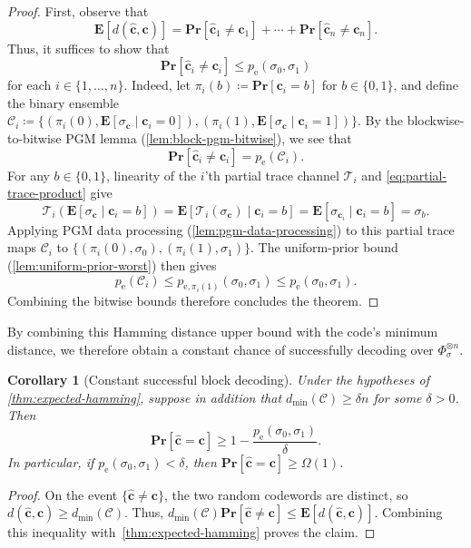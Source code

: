 \documentclass[11pt]{article}
\renewcommand{\leq}{\leqslant}
\renewcommand{\geq}{\geqslant}
\newtheorem{corollary}[corollary]{Corollary}
\theoremstyle{remark}
\newcommand{\cC}{\mathcal{C}}
\newcommand{\T}{\mathcal{T}}
\newcommand{\Eb}{\mathbf{E}}
\newcommand{\Prb}{\mathbf{Pr}}
\newcommand{\bits}{\{0,1\}}
\newcommand{\bchat}{\hat{\mathbf{c}}}
\newcommand{\bc}{\mathbf{c}}
\begin{document}
\begin{proof}
First, observe that
\begin{equation*}
\Eb[d(\bchat,\bc)] = \Prb[\bchat_1 \neq \bc_1] + \cdots + \Prb[\bchat_n \neq \bc_n].
\end{equation*}
Thus, it suffices to show that
\begin{equation*}
\Prb[\bchat_i \neq \bc_i] \leq p_{\mathrm{e}}(\sigma_0,\sigma_1)
\end{equation*}
for each $i \in \{1, \ldots , n\}$. Indeed, let $\pi_i(b) \coloneqq \Prb[\bc_i = b]$ for $b \in \bits$, and define the binary ensemble $\cC_i \coloneqq \{(\pi_i(0), \Eb[\sigma_{\bc} \mid \bc_i = 0]), (\pi_i(1), \Eb[\sigma_{\bc} \mid \bc_i = 1])\}$. By the blockwise-to-bitwise PGM lemma (\cref{lem:block-pgm-bitwise}), we see that
\begin{equation*}
\Prb[\bchat_i \neq \bc_i] = p_{\mathrm{e}}(\cC_i).
\end{equation*}
For any $b \in \bits$, linearity of the $i$'th partial trace channel $\T_i$ and \eqref{eq:partial-trace-product} give
\begin{equation*}
\T_i\left(\Eb[\sigma_\bc \mid \bc_i = b]\right)
= \Eb[\T_i(\sigma_\bc) \mid \bc_i = b]
= \Eb[\sigma_{\bc_i} \mid \bc_i = b]
= \sigma_b.
\end{equation*}
Applying PGM data processing (\cref{lem:pgm-data-processing}) to this partial trace maps $\cC_i$ to $\{(\pi_i(0),\sigma_0),(\pi_i(1),\sigma_1)\}$. The uniform-prior bound (\cref{lem:uniform-prior-worst}) then gives
\begin{equation*}
p_{\mathrm{e}}(\cC_i) \leq p_{\mathrm{e},\pi_i(1)}(\sigma_0,\sigma_1) \leq p_{\mathrm{e}}(\sigma_0,\sigma_1).
\end{equation*}
Combining the bitwise bounds therefore concludes the theorem.
\end{proof}

By combining this Hamming distance upper bound with the code's minimum distance, we therefore obtain a constant chance of successfully decoding over $\Phi_\sigma^{\otimes n}$.

\begin{corollary}[Constant successful block decoding]
\label{cor:block-error}
Under the hypotheses of \cref{thm:expected-hamming}, suppose in addition that $d_{\min}(\cC) \geq \delta n$ for some $\delta > 0$. Then
\begin{equation*}
\Prb[\bchat = \bc] \geq 1-\frac{p_{\mathrm{e}}(\sigma_0,\sigma_1)}{\delta}.
\end{equation*}
In particular, if $p_{\mathrm{e}}(\sigma_0,\sigma_1) < \delta$, then $\Prb[\bchat = \bc] \geq \Omega(1)$.
\end{corollary}
\begin{proof}
On the event $\{\bchat \neq \bc\}$, the two random codewords are distinct, so $d(\bchat,\bc) \geq d_{\min}(\cC)$. Thus, $d_{\min}(\cC)\Prb[\bchat \neq \bc] \leq \Eb[d(\bchat,\bc)]$. Combining this inequality with~\cref{thm:expected-hamming} proves the claim.\qedhere
\end{proof}
\end{document}
